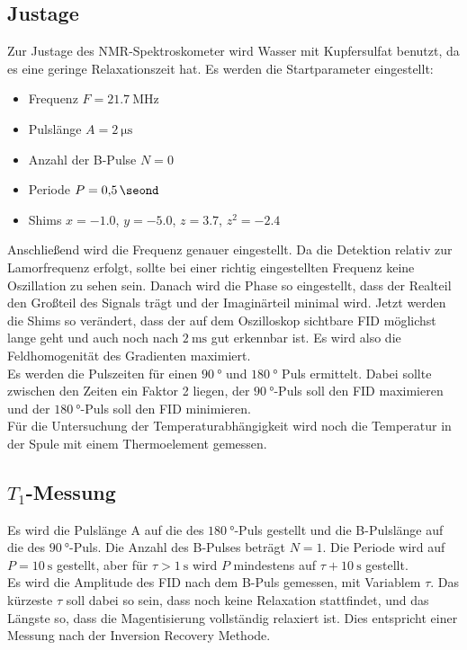     \subsection{Justage}

        \noindent Zur Justage des NMR-Spektroskometer wird Wasser mit Kupfersulfat benutzt, da es eine geringe Relaxationszeit hat. Es werden die Startparameter eingestellt: 
        \begin{itemize}
            \item Frequenz $F = \SI{21.7}{\mega\hertz}$
            \item Pulslänge $A = \SI{2}{\micro\second}$
            \item Anzahl der B-Pulse $N = \num{0}$ 
            \item Periode $P = \SI{0.5}{\seond}$ 
            \item Shims $x = \num{-1.0}$, $y = \num{-5.0}$, $z = \num{3.7}$, $z^2 = \num{-2.4}$
        \end{itemize}
        Anschließend wird die Frequenz genauer eingestellt. Da die Detektion relativ zur Lamorfrequenz erfolgt, sollte bei einer richtig eingestellten Frequenz keine Oszillation zu sehen sein. 
        Danach wird die Phase so eingestellt, dass der Realteil den Großteil des Signals trägt und der Imaginärteil minimal wird. Jetzt werden die Shims so verändert, dass der auf dem Oszilloskop 
        sichtbare FID möglichst lange geht und auch noch nach $\SI{2}{\milli\second}$ gut erkennbar ist. Es wird also die Feldhomogenität des Gradienten maximiert. \\
        Es werden die Pulszeiten für einen $\SI{90}{\degree}$ und $\SI{180}{\degree}$ Puls ermittelt. Dabei sollte zwischen den Zeiten ein Faktor 2 liegen, der $\SI{90}{\degree}$-Puls soll den 
        FID maximieren und der $\SI{180}{\degree}$-Puls soll den FID minimieren. \\
        Für die Untersuchung der Temperaturabhängigkeit wird noch die Temperatur in der Spule mit einem Thermoelement gemessen. 
        
    \subsection{$T_1$-Messung}

        \noindent Es wird die Pulslänge A auf die des $\SI{180}{\degree}$-Puls gestellt und die B-Pulslänge auf die des $\SI{90}{\degree}$-Puls. Die Anzahl des B-Pulses beträgt $N = 1$. Die Periode 
        wird auf $ P = \SI{10}{\second}$ gestellt, aber für $\tau > \SI{1}{\second}$ wird $P$ mindestens auf $\tau + \SI{10}{\second}$ gestellt.\\ 
        Es wird die Amplitude des FID nach dem B-Puls gemessen, mit Variablem $\tau$. Das kürzeste $\tau$ soll dabei so sein, dass noch keine Relaxation stattfindet, und das Längste so, dass die Magentisierung 
        vollständig relaxiert ist. Dies entspricht einer Messung nach der Inversion Recovery Methode.

